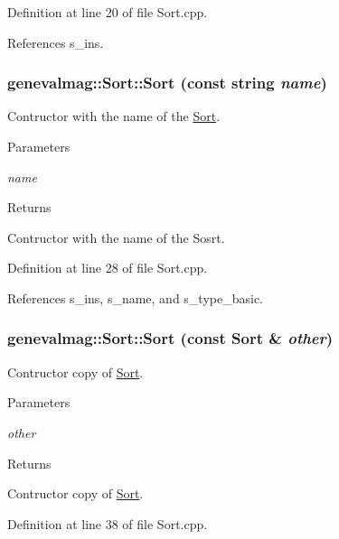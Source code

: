 Definition at line 20 of file Sort.cpp.



References s\_\-ins.

\hypertarget{classgenevalmag_1_1Sort_a741ce3c7c95b313f4a7d04588d2f32ec}{
\subsubsection[{Sort}]{\setlength{\rightskip}{0pt plus 5cm}genevalmag::Sort::Sort (const string {\em name})}}
\label{classgenevalmag_1_1Sort_a741ce3c7c95b313f4a7d04588d2f32ec}
Contructor with the name of the \hyperlink{classgenevalmag_1_1Sort}{Sort}. 
\begin{DoxyParams}{Parameters}
\item[{\em name}]\end{DoxyParams}
\begin{DoxyReturn}{Returns}

\end{DoxyReturn}
Contructor with the name of the Sosrt. 

Definition at line 28 of file Sort.cpp.



References s\_\-ins, s\_\-name, and s\_\-type\_\-basic.

\hypertarget{classgenevalmag_1_1Sort_ab2cce40fbf624c23b0371c3a7f931ac4}{
\subsubsection[{Sort}]{\setlength{\rightskip}{0pt plus 5cm}genevalmag::Sort::Sort (const {\bf Sort} \& {\em other})}}
\label{classgenevalmag_1_1Sort_ab2cce40fbf624c23b0371c3a7f931ac4}
Contructor copy of \hyperlink{classgenevalmag_1_1Sort}{Sort}. 
\begin{DoxyParams}{Parameters}
\item[{\em other}]\end{DoxyParams}
\begin{DoxyReturn}{Returns}

\end{DoxyReturn}
Contructor copy of \hyperlink{classgenevalmag_1_1Sort}{Sort}. 

Definition at line 38 of file Sort.cpp.



